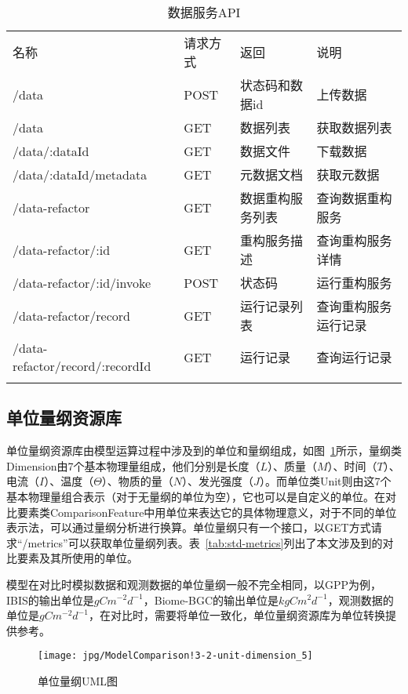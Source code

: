 \begin{table}[!htbp]
    \centering
    \caption{数据服务API}
    \label{tab:data-service-API}
    \begin{tabular}{llll}
        \Xhline{1.5pt}
        名称 & 请求方式 & 返回 & 说明 \\
        \Xhline{1.5pt}
        /data & POST & 状态码和数据id & 上传数据 \\
        /data & GET & 数据列表 & 获取数据列表 \\
        /data/:dataId & GET & 数据文件 & 下载数据 \\
        /data/:dataId/metadata & GET & 元数据文档 & 获取元数据 \\
        /data-refactor & GET & 数据重构服务列表 & 查询数据重构服务 \\
        /data-refactor/:id & GET & 重构服务描述 & 查询重构服务详情 \\
        /data-refactor/:id/invoke & POST & 状态码 & 运行重构服务 \\
        /data-refactor/record & GET & 运行记录列表 & \multicolumn{1}{m{0.3\columnwidth}}{查询重构服务运行记录} \\
        /data-refactor/record/:recordId & GET & 运行记录 & 查询运行记录 \\
        \Xhline{1.5pt}
    \end{tabular}
\end{table}

\subsection{单位量纲资源库}
单位量纲资源库由模型运算过程中涉及到的单位和量纲组成，如图~\ref{fig:ModelComparison!3-2-unit-dimension_5}所示，量纲类Dimension由7个基本物理量组成，他们分别是长度（$L$）、质量（$M$）、时间（$T$）、电流（$I$）、温度（$\Theta$）、物质的量（$N$）、发光强度（$J$）。而单位类Unit则由这7个基本物理量组合表示（对于无量纲的单位为空），它也可以是自定义的单位。在对比要素类ComparisonFeature中用单位来表达它的具体物理意义，对于不同的单位表示法，可以通过量纲分析进行换算。单位量纲只有一个接口，以GET方式请求“/metrics”可以获取单位量纲列表。表~\ref{tab:std-metrics}列出了本文涉及到的对比要素及其所使用的单位。

模型在对比时模拟数据和观测数据的单位量纲一般不完全相同，以GPP为例，IBIS的输出单位是$gC m^{-2} d^{-1}$，Biome-BGC的输出单位是$kgC m^2 d^{-1}$，观测数据的单位是$gC m^{-2} d^{-1}$，在对比时，需要将单位一致化，单位量纲资源库为单位转换提供参考。

\begin{figure}[!htbp]
    \centering
    \texttt{[image: jpg/ModelComparison!3-2-unit-dimension\_5]}
    \caption{单位量纲UML图}
    \label{fig:ModelComparison!3-2-unit-dimension_5}
\end{figure}

